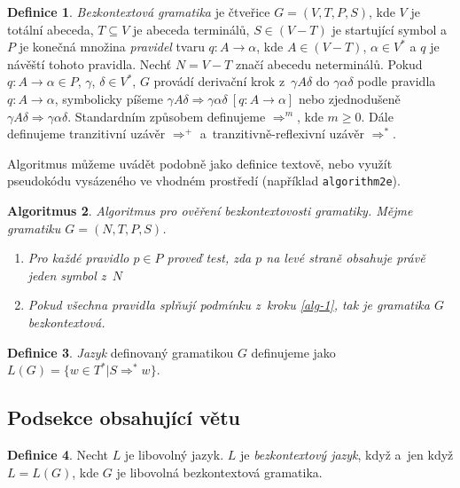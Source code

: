 \documentclass[11pt, a4paper, twocolumn, titlepage] {article}
\theoremstyle{definition}
\newtheorem{definition}{Definice}[section]
\newtheorem{algorithm}[definition]{Algoritmus}
\begin{document}
\begin{definition} \label{def:matematicky_text-def1-1}
\emph{Bezkontextová gramatika} je čtveřice $G=(V,T,P,S)$, kde $V$ je totální abeceda, $T \subseteq V$ je abeceda terminálů, $S \in (V-T)$ je startující symbol a~$P$ je konečná množina \emph{pravidel} tvaru $q\colon A\rightarrow \alpha$, kde $A\in (V-T)$, $\alpha \in V^*$ a $q$ je návěští tohoto pravidla. Nechť $N = V - T$ značí abecedu neterminálů. 
Pokud $q\colon A \rightarrow \alpha\in P$, $\gamma$, $\delta \in V^*$, $G$ provádí derivační krok z~$\gamma A \delta$ do $\gamma \alpha \delta$ podle pravidla $q\colon A \rightarrow \alpha$, symbolicky píšeme $\gamma A \delta \Rightarrow \gamma\alpha\delta \ [ q\colon A \rightarrow \alpha ]$ nebo zjednodušeně $\gamma A \delta \Rightarrow \gamma\alpha\delta$. Standardním způsobem definujeme $\Rightarrow^m$, kde $m \geq 0$. Dále definujeme tranzitivní uzávěr $\Rightarrow^+$ a~tranzitivně-reflexivní uzávěr $\Rightarrow^*$.
\end{definition}


Algoritmus můžeme uvádět podobně jako definice textově, nebo využít pseudokódu vysázeného ve vhodném prostředí (například \verb|algorithm2e|).

\begin{algorithm}
\emph{Algoritmus pro ověření bezkontextovosti gramatiky. Mějme gramatiku $G = (N, T, P, S)$.}
\begin{enumerate}
\item \label{alg-1} \emph{Pro každé pravidlo $p \in P$ proveď test, zda $p$ na levé straně obsahuje právě jeden symbol z~$N$}
\item \emph {Pokud všechna pravidla splňují podmínku z~kroku \ref{alg-1}, tak je gramatika $G$ bezkontextová.}
\end{enumerate}
\end{algorithm}

\begin{definition}
\emph{Jazyk} definovaný gramatikou $G$ definujeme jako $L(G) = \{w \in T^*|S \Rightarrow^*w\}$.
\end{definition}


\subsection{Podsekce obsahující větu}
\begin{definition}
Necht $L$ je libovolný jazyk. $L$ je \emph{bezkontextový jazyk}, když a~jen když $L = L(G)$, kde $G$ je libovolná bezkontextová gramatika.
\end{definition}
\end{document}
